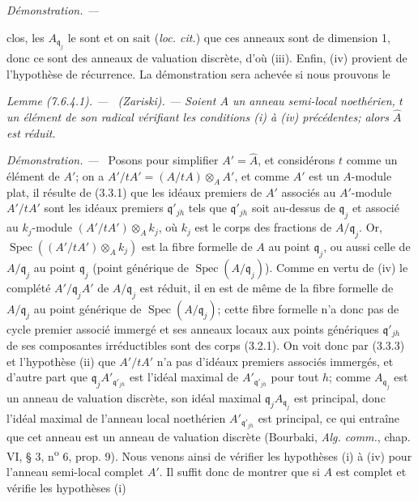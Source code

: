\documentclass[10pt,oneside]{book}
\newcommand{\oldpage}[2][]{%
  \setcounter{footnote}{0}%
  \marginpar{\scriptsize\textbf{#1}~|~#2}\ignorespaces}
\newenvironment{lemma}[1][]{%
  \par\medskip\noindent\itshape Lemme (#1). ---\ }{\par}
\newenvironment{proof}{%
  \par\medskip\noindent\textit{Démonstration. ---\ }}{\par}
\begin{document}
\begin{proof}
\oldpage[IV-2]{211}

clos, les $A_{\mathfrak q_j}$ le sont et on sait (\emph{loc. cit.}) que ces
anneaux sont de dimension 1, donc ce sont des anneaux de valuation discrète,
d'où (iii). Enfin, (iv) provient de l'hypothèse de récurrence. La démonstration
sera achevée si nous prouvons le

\begin{lemma}[7.6.4.1]
\label{IV.2.s7.6.4.1-fr}
(Zariski). --- Soient $A$ un anneau semi-local noethérien, $t$ un élément de
son radical vérifiant les conditions (i) à (iv) précédentes; alors
$\widehat A$ est réduit.
\end{lemma}

\begin{proof}
Posons pour simplifier $A'=\widehat A$, et considérons $t$ comme un élément de
$A'$; on a $A'/tA'=(A/tA)\otimes_AA'$, et comme $A'$ est un $A$-module plat,
il résulte de (3.3.1) que les idéaux premiers de $A'$ associés au $A'$-module
$A'/tA'$ sont les idéaux premiers $\mathfrak q'_{jh}$ tels que
$\mathfrak q'_{jh}$ soit au-dessus de $\mathfrak q_j$ et associé au
$k_j$-module $(A'/tA')\otimes_Ak_j$, où $k_j$ est le corps des fractions de
$A/\mathfrak q_j$. Or,
$\operatorname{Spec}((A'/tA')\otimes_Ak_j)$ est la fibre formelle de $A$ au
point $\mathfrak q_j$, ou aussi celle de $A/\mathfrak q_j$ au point
$\mathfrak q_j$ (point générique de
$\operatorname{Spec}(A/\mathfrak q_j)$). Comme en vertu de (iv) le complété
$A'/\mathfrak q_jA'$ de $A/\mathfrak q_j$ est réduit, il en est de même de la
fibre formelle de $A/\mathfrak q_j$ au point générique de
$\operatorname{Spec}(A/\mathfrak q_j)$; cette fibre formelle n'a donc pas de
cycle premier associé immergé et ses anneaux locaux aux points génériques
$\mathfrak q'_{jh}$ de ses composantes irréductibles sont des corps (3.2.1).
On voit donc par (3.3.3) et l'hypothèse (ii) que $A'/tA'$ n'a pas d'idéaux
premiers associés immergés, et d'autre part que
$\mathfrak q_jA'_{\mathfrak q'_{jh}}$ est l'idéal maximal de
$A'_{\mathfrak q'_{jh}}$ pour tout $h$; comme $A_{\mathfrak q_j}$ est un
anneau de valuation discrète, son idéal maximal
$\mathfrak q_jA_{\mathfrak q_j}$ est principal, donc l'idéal maximal de
l'anneau local noethérien $A'_{\mathfrak q'_{jh}}$ est principal, ce qui
entraîne que cet anneau est un anneau de valuation discrète (Bourbaki,
\emph{Alg. comm.}, chap. VI, § 3, n\textsuperscript{o} 6, prop. 9). Nous venons
ainsi de vérifier les hypothèses (i) à (iv) pour l'anneau semi-local complet $A'$.
Il suffit donc de montrer que si $A$ est complet et vérifie les hypothèses (i)

\end{proof}
\end{proof}
\end{document}
